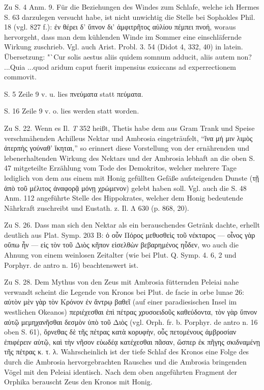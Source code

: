 \documentclass[a4paper, 11pt, oneside]{article}
\begin{document}
Zu S. 4 Anm. 9. Für die Beziehungen des Windes zum Schlafe, welche ich Hermes S. 63 darzulegen versucht habe, ist nicht unwichtig die Stelle bei Sophokles Phil. 18 (vgl. 827 f.): ἐν θέρει δ' ὕπνον δι' ἀμφιτρῆτος αὐλίου πέμπει πνοή, woraus hervorgeht, dass man dem kühlenden Winde im Sommer eine einschläfernde Wirkung zuschrieb. Vgl. auch Arist. Probl. 3. 54 (Didot 4, 332, 40) in latein. Übersetzung: "`Cur solis aestus aliis quidem somnum adducit, aliis autem non? ...Quia ...quod aridum caput fuerit impensius exsiccans ad experrectionem commovit.

S. 5 Zeile 9 v. u. lies πνεύματα statt πεύματα.

S. 16 Zeile 9 v. o. lies werden statt worden.

Zu S. 22. Wenn es Il. \emph{T} 352 heißt, Thetis habe dem aus Gram Trank und Speise verschmähenden Achilleus Nektar und Ambrosia eingeträufelt, "`ἵνα μή μιν λιμὸς ἀτερπὴς γούναθ' ἵκηται,"' so erinnert diese Vorstellung von der ernährenden und lebenerhaltenden Wirkung des Nektars und der Ambrosia lebhaft an die oben S. 47 mitgeteilte Erzählung vom Tode des Demokritos, welcher mehrere Tage lediglich von dem aus einem mit Honig gefüllten Gefäße aufsteigenden Dunste (τῇ ἀπὸ τοῦ μέλιτος ἀναφορᾷ μόνῃ χρώμενον) gelebt haben soll. Vgl. auch die S. 48 Anm. 112 angeführte Stelle des Hippokrates, welcher dem Honig bedeutende Nährkraft zuschreibt und Eustath. z. Il. Λ 630 (p. 868, 20).

Zu S. 26. Dass man sich den Nektar als ein berauschendes Getränk dachte, erhellt deutlich aus Plat. Symp. 203 B: ὁ οὖν Πόρος μεθυσθεὶς τοῦ νέκταρος --- οἶνος γὰρ οὔπω ἦν --- εἰς τὸν τοῦ Διὸς κῆπον εἰσελθὼν βεβαρημένος ηὗδεν, wo auch die Ahnung von einem weinlosen Zeitalter (wie bei Plut. Q. Symp. 4. 6, 2 und Porphyr. de antro n. 16) beachtenswert ist.

Zu S. 28. Dem Mythus von den Zeus mit Ambrosia fütternden Peleiai nahe verwandt scheint die Legende von Kronos bei Plut. de facie in orbe lunae 26: αὐτὸν μὲν γὰρ τὸν Κρόνον ἐν ἄντρῳ βαθεῖ (auf einer paradiesischen Insel im westlichen Okeanos) περιέχεσθαι ἐπὶ πέτρας χρυσοειδοῦς καθεύδοντα, τὸν γὰρ ὕπνον αὐτῷ μεμηχανῆσθαι δεσμὸν ὑπὸ τοῦ Διὸς (vgl. Orph. fr. b. Porphyr. de antro n. 16 oben S. 61), ὄρνεθας δὲ τῆς πέτρας κατὰ κορυφὴν, οὖς πετομένους ἀμβροσίαν ἐπιφέρειν αὐτῷ, καὶ τὴν νῆσον εὐωδέᾳ κατέχεσθαι πᾶσαν, ὥσπερ ἐκ πῆγης σκιδναμένῃ τῆς πέτρας κ. τ. λ. Wahrscheinlich ist der tiefe Schlaf des Kronos eine Folge des durch die Ambrosia hervorgebrachten Rausches und die Ambrosia bringenden Vögel mit den Peleiai identisch. Nach dem oben angeführten Fragment der Orphika berauscht Zeus den Kronos mit Honig.
\end{document}
